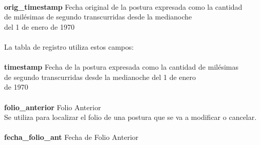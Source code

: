 \documentclass[11pt]{article}
\numberwithin{equation}{section} %
\begin{document}
\begin{tabbing}
\\
\textbf{orig\_timestamp} \> Fecha original de la postura expresada como la cantidad\\
\>de milésimas de segundo transcurridas desde la medianoche\\
\>del 1 de enero de 1970\\
\\
La tabla de registro utiliza estos campos:\\
\\
\textbf{timestamp} \> Fecha de la postura expresada como la cantidad de milésimas\\
\> de segundo transcurridas desde la medianoche del 1 de enero\\
\>de 1970\\
\\
\textbf{folio\_anterior} \> Folio Anterior\\
Se utiliza para localizar el folio de una postura que se va a modificar o cancelar.\\
\\
\textbf{fecha\_folio\_ant} \> Fecha de Folio Anterior\\
\end{tabbing}
\end{document}
